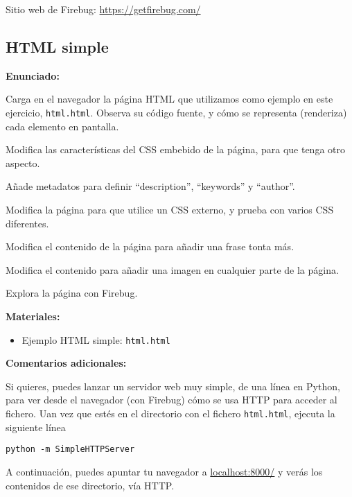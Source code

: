 Sitio web de Firebug: \url{https://getfirebug.com/}


\subsection{HTML simple}
\label{subsec:eje-html-simple}

\textbf{Enunciado:}

Carga en el navegador la página HTML que utilizamos como ejemplo en este ejercicio, \verb|html.html|. Observa su código fuente, y cómo se representa (renderiza) cada elemento en pantalla.

Modifica las características del CSS embebido de la página, para que tenga otro aspecto.

Añade metadatos para definir ``description'', ``keywords'' y ``author''.

Modifica la página para que utilice un CSS externo, y prueba con varios CSS diferentes.

Modifica el contenido de la página para añadir una frase tonta más.

Modifica el contenido para añadir una imagen en cualquier parte de la página.

Explora la página con Firebug.

\textbf{Materiales:}

\begin{itemize}
\item Ejemplo HTML simple: \verb|html.html|
\end{itemize}

\textbf{Comentarios adicionales:}

Si quieres, puedes lanzar un servidor web muy simple, de una línea en Python, para ver desde el navegador (con Firebug) cómo se usa HTTP para acceder al fichero. Uan vez que estés en el directorio con el fichero \verb|html.html|, ejecuta la siguiente línea

\begin{verbatim}
python -m SimpleHTTPServer
\end{verbatim}

A continuación, puedes apuntar tu navegador a \url{localhost:8000/} y verás los contenidos de ese directorio, vía HTTP.

